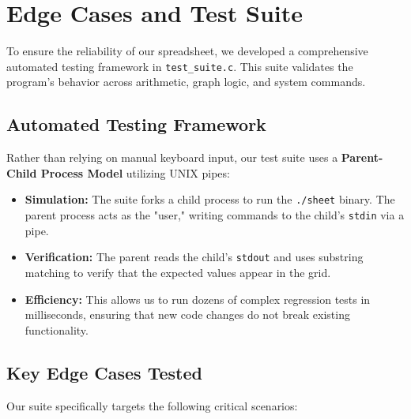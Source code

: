 \documentclass[twocolumn]{article}
\begin{document}
\section{Edge Cases and Test Suite}

To ensure the reliability of our spreadsheet, we developed a comprehensive automated testing framework in \texttt{test\_suite.c}. This suite validates the program's behavior across arithmetic, graph logic, and system commands.

\subsection{Automated Testing Framework}
Rather than relying on manual keyboard input, our test suite uses a \textbf{Parent-Child Process Model} utilizing UNIX pipes:
\begin{itemize}
    \item \textbf{Simulation:} The suite forks a child process to run the \texttt{./sheet} binary. The parent process acts as the "user," writing commands to the child's \texttt{stdin} via a pipe.
    \item \textbf{Verification:} The parent reads the child's \texttt{stdout} and uses substring matching to verify that the expected values appear in the grid.
    \item \textbf{Efficiency:} This allows us to run dozens of complex regression tests in milliseconds, ensuring that new code changes do not break existing functionality.
\end{itemize}

\subsection{Key Edge Cases Tested}
Our suite specifically targets the following critical scenarios:
\end{document}
